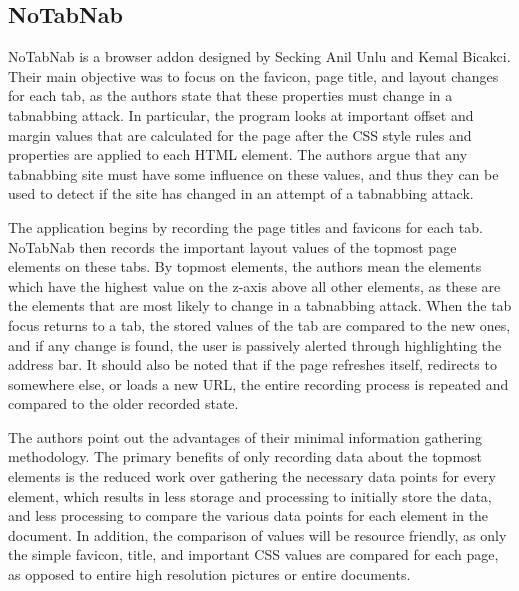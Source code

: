 \documentclass[12pt]{article}
\begin{document}
\begin{doublespace}
\subsection{NoTabNab}
\begin{comment}
Another extension, NoTabNab created by Seckin Anil Unlu and Kemal Bicakci \cite{NoTabNab}, notifies the user when the favicon or the tab name change as well as when a new layer is added to an inactive tab. 
\end{comment}

NoTabNab is a browser addon designed by Secking Anil Unlu and Kemal Bicakci.  Their main objective was to focus on the favicon, page title, and layout changes for each tab, as the authors state that these properties must change in a tabnabbing attack.  In particular, the program looks at important offset and margin values that are calculated for the page after the CSS style rules and properties are applied to each HTML element.  The authors argue that any tabnabbing site must have some influence on these values, and thus they can be used to detect if the site has changed in an attempt of a tabnabbing attack.

The application begins by recording the page titles and favicons for each tab.  NoTabNab then records the important layout values of the topmost page elements on these tabs.  By topmost elements, the authors mean the elements which have the highest value on the z-axis above all other elements, as these are the elements that are most likely to change in a tabnabbing attack.  When the tab focus returns to a tab, the stored values of the tab are compared to the new ones, and if any change is found, the user is passively alerted through highlighting the address bar.  It should also be noted that if the page refreshes itself, redirects to somewhere else, or loads a new URL, the entire recording process is repeated and compared to the older recorded state. 

The authors point out the advantages of their minimal information gathering methodology.  The primary benefits of only recording data about the topmost elements is the reduced work over gathering the necessary data points for every element, which results in less storage and processing to initially store the data, and less processing to compare the various data points for each element in the document.  In addition, the comparison of values will be resource friendly, as only the simple favicon, title, and important CSS values are compared for each page, as opposed to entire high resolution pictures or entire documents.  


\end{doublespace}
\end{document}
